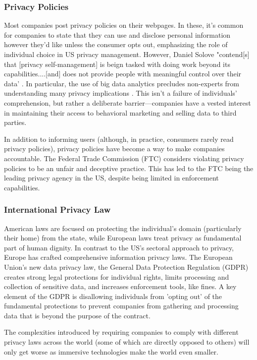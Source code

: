 \subsubsection{Privacy Policies}

Most companies post privacy policies on their webpages. In these, it's common for companies to state that they can use and disclose personal information however they'd like unless the consumer opts out, emphasizing the role of individual choice in US privacy management. However, Daniel Solove "contend[s] that [privacy self-management] is beign tasked with doing work beyond its capabilities....[and] does not provide people with meaningful control over their data' \cite{solove2012introduction}. In particular, the use of big data analytics precludes non-experts from understanding many privacy implications \cite{baruh2017big}. This isn't a failure of individuals' comprehension, but rather a deliberate barrier---companies have a vested interest in maintaining their access to behavioral marketing and selling data to third parties.

In addition to informing users (although, in practice, consumers rarely read privacy policies), privacy policies have become a way to make companies accountable. The Federal Trade Commission (FTC) considers violating privacy policies to be an unfair and deceptive practice. This has led to the FTC being the leading privacy agency in the US, despite being limited in enforcement capabilities.

\subsubsection{International Privacy Law}

American laws are focused on protecting the individual's domain (particularly their home) from the state, while European laws treat privacy as fundamental part of human dignity.
In contrast to the US's sectoral approach to privacy, Europe has crafted comprehensive information privacy laws. The European Union's new data privacy law, the General Data Protection Regulation (GDPR) creates strong legal protections for individual rights, limits processing and collection of sensitive data, and increases enforcement tools, like fines. A key element of the GDPR is disallowing individuals from 'opting out' of the fundamental protections to prevent companies from gathering and processing data that is beyond the purpose of the contract.

The complexities introduced by requiring companies to comply with different privacy laws across the world (some of which are directly opposed to others) will only get worse as immersive technologies make the world even smaller.

